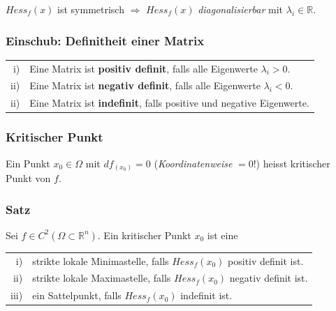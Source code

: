 \documentclass[a4paper, fontsize = 8pt, landscape]{scrartcl}
\newcommand{\R}[0]{\mathbb{R}}
\begin{document}
\begin{multicols*}{3}
    $Hess_f (x)$ ist symmetrisch $\Rightarrow$ $Hess_f (x)$ \emph{diagonalisierbar} mit $\lambda_i \in \R$.

    \subsubsection{Einschub: Definitheit einer Matrix}

    \begin{tabular}{r l}
        i)  & \hspace*{-13pt} Eine Matrix ist \textbf{positiv definit}, falls alle Eigenwerte $\lambda_i > 0$. \\
        ii) & \hspace*{-13pt} Eine Matrix ist \textbf{negativ definit}, falls alle Eigenwerte $\lambda_i < 0$. \\
        ii) & \hspace*{-13pt} Eine Matrix ist \textbf{indefinit}, falls positive und negative Eigenwerte.      \\
    \end{tabular}

    \subsubsection{Kritischer Punkt}

    Ein Punkt $x_0 \in \Omega$ mit $df_{(x_0)} = 0$ (\emph{Koordinatenweise} $= 0$!) heisst kritischer Punkt von $f$.

    \subsubsection{Satz}

    Sei $f \in C^2(\Omega \subset \R^n)$. Ein kritischer Punkt $x_0$ ist eine

    \begin{center}
        \begin{tabular}{r l} \toprule
            i)   & \hspace*{-10pt} strikte lokale Minimastelle, falls $Hess_f (x_0)$ positiv definit ist. \\
            ii)  & \hspace*{-10pt} strikte lokale Maximastelle, falls $Hess_f (x_0)$ negativ definit ist. \\
            iii) & \hspace*{-10pt} ein Sattelpunkt, falls $Hess_f (x_0)$ indefinit ist.                   \\
            \bottomrule
        \end{tabular}
    \end{center}


\end{multicols*}
\end{document}
